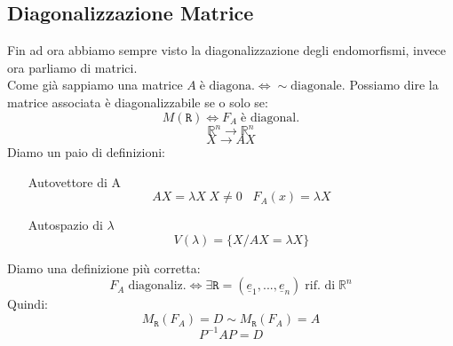 \subsection{Diagonalizzazione Matrice}
Fin ad ora abbiamo sempre visto la diagonalizzazione degli endomorfismi, invece ora parliamo di matrici.\\
Come già sappiamo una matrice $A \; \text{è diagona.} \Leftrightarrow \sim \text{diagonale}$.
Possiamo dire la matrice associata è diagonalizzabile se o solo se:
$$ M(\mathtt{R}) \Leftrightarrow F_A \; \text{è diagonal.}$$
$$ \mathbb{R}^n \rightarrow \mathbb{R}^n $$
$$ X \rightarrow AX $$
Diamo un paio di definizioni:
\begin{itemize}
\item[Autovettore di A] 
$$ AX= \lambda X \; X \neq 0  \;\;\; F_A(x) = \lambda X $$

\item[Autospazio di $\lambda$]
$$ V(\lambda) = \{X/ AX = \lambda X \} $$

\end{itemize}
Diamo una definizione più corretta:
$$ F_A \; \text{diagonaliz.} \Leftrightarrow \exists \mathtt{R}=(\underline{e}_1,...,\underline{e}_n) \; \text{rif. di} \; \mathbb{R}^n $$
Quindi:
$$ M_{\mathtt{R}}(F_A) = D \sim M_{\mathtt{R}}(F_A) = A $$
$$ P^{-1}AP = D $$


